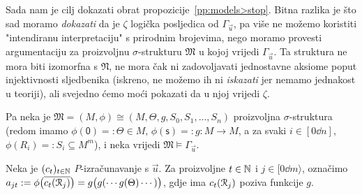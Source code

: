 Sada nam je cilj dokazati obrat propozicije~\ref{pp:models>stop}. Bitna razlika je što sad moramo \emph{dokazati} da je $\zeta$ logička posljedica od $\Gamma_{\vec u}$, pa više ne možemo koristiti "intendiranu interpretaciju" s prirodnim brojevima, nego moramo provesti argumentaciju za proizvoljnu $\sigma$-strukturu $\mathfrak M$ u kojoj vrijedi $\Gamma_{\vec u}$. Ta struktura ne mora biti izomorfna s $\mathfrak N$, ne mora čak ni zadovoljavati jednostavne aksiome poput injektivnosti sljedbenika (iskreno, ne možemo ih ni \emph{iskazati} jer nemamo jednakost u teoriji), ali svejedno ćemo moći pokazati da u njoj vrijedi $\zeta$.

Pa neka je $\mathfrak M=(M,\phi)\cong(M,\Theta,g,S_0,S_1,\dotsc,S_n)$ proizvoljna $\sigma$-struktura (redom imamo $\phi(\mathsf0)=:\Theta\in M$, $\phi(\mathsf s)=:g:M\to M$, a za svaki $i\in[0\dd n]$, $\phi(R_i)=:S_i\subseteq M^m$), i neka vrijedi $\mathfrak M\models\Gamma_{\vec u}$.

Neka je $(c_t)_{t\in{\mathbb N}}$ $P$-izračunavanje s $\vec u$. Za proizvoljne $t\in{\mathbb N}$ i $j\in[0\dd m\rangle$, označimo $a_{jt}:=\phi\bigl(\overline{c_t(\mathcal R_{j})}\bigr)=g\bigl(g(\dotsb g(\Theta)\dotsb)\bigr)$, gdje ima $c_t(\mathcal R_{j})$ poziva funkcije $g$.

